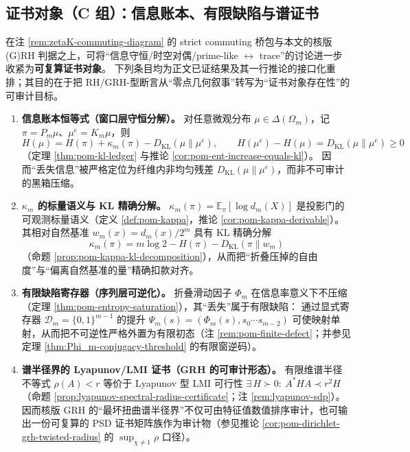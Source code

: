 \subsection{证书对象（C 组）：信息账本、有限缺陷与谱证书}\label{subsubsec:bridgepack-hard-conclusions}
在注 \ref{rem:zetaK-commuting-diagram} 的 strict commuting 桥包与本文的核版 (G)RH 判据之上，可将“信息守恒/时空对偶/prime-like \(\leftrightarrow\) trace”的讨论进一步收紧为\textbf{可复算证书对象}。
下列条目均为正文已证结果及其一行推论的接口化重排；其目的在于把 RH/GRH-型断言从“零点几何叙事”转写为“证书对象存在性”的可审计目标。
\begin{enumerate}
  \item \textbf{信息账本恒等式（窗口层守恒分解）。}
  对任意微观分布 \(\mu\in\Delta(\Omega_m)\)，记 \(\pi=P_m\mu\)、\(\mu^e=K_m\mu\)，则
  \[
  H(\mu)=H(\pi)+\kappa_m(\pi)-D_{\mathrm{KL}}(\mu\|\mu^e),
  \qquad
  H(\mu^e)-H(\mu)=D_{\mathrm{KL}}(\mu\|\mu^e)\ge 0
  \]
  （定理 \ref{thm:pom-kl-ledger} 与推论 \ref{cor:pom-ent-increase-equals-kl}）。
  因而“丢失信息”被严格定位为纤维内非均匀残差 \(D_{\mathrm{KL}}(\mu\|\mu^e)\)，而非不可审计的黑箱压缩。

  \item \textbf{\texorpdfstring{$\kappa_m$}{kappa} 的标量语义与 KL 精确分解。}
  \(\kappa_m(\pi)=\mathbb{E}_\pi[\log d_m(X)]\) 是投影门的可观测标量语义（定义 \ref{def:pom-kappa}，推论 \ref{cor:pom-kappa-derivable}）。
  其相对自然基准 \(w_m(x)=d_m(x)/2^m\) 具有 KL 精确分解
  \[
  \kappa_m(\pi)=m\log 2-H(\pi)-D_{\mathrm{KL}}(\pi\|w_m)
  \]
  （命题 \ref{prop:pom-kappa-kl-decomposition}），从而把“折叠压掉的自由度”与“偏离自然基准的量”精确扣款对齐。

  \item \textbf{有限缺陷寄存器（序列层可逆化）。}
  折叠滑动因子 \(\Phi_m\) 在信息率意义下不压缩（定理 \ref{thm:pom-entropy-saturation}），其“丢失”属于有限缺陷：
  通过显式寄存器 \(\mathcal{D}_m=\{0,1\}^{m-1}\) 的提升
  \(
  \Psi_m(s)=(\Phi_m(s),s_0\cdots s_{m-2})
  \)
  可使映射单射，从而把不可逆性严格外置为有限初态（注 \ref{rem:pom-finite-defect}；并参见定理 \ref{thm:Phi_m-conjugacy-threshold} 的有限窗逆码）。

  \item \textbf{谱半径界的 Lyapunov/LMI 证书（GRH 的可审计形态）。}
  有限维谱半径不等式 \(\rho(A)<r\) 等价于 Lyapunov 型 LMI 可行性
  \(
  \exists\,H\succ0:\ A^\ast H A\prec r^2H
  \)
  （命题 \ref{prop:lyapunov-spectral-radius-certificate}；注 \ref{rem:lyapunov-sdp}）。
  因而核版 GRH 的“最坏扭曲谱半径界”不仅可由特征值数值排序审计，也可输出一份可复算的 PSD 证书矩阵族作为审计物（参见推论 \ref{cor:pom-dirichlet-grh-twisted-radius} 的 \(\sup_{\chi\ne 1}\rho\) 口径）。


\end{enumerate}
